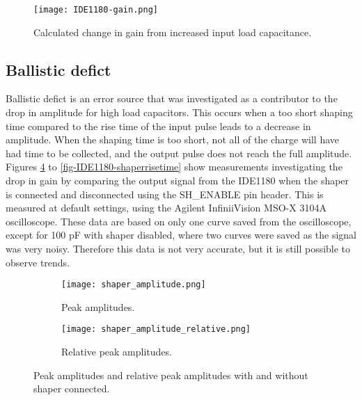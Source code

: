 \documentclass[../main/thesis.tex]{subfiles}
\begin{document}
\begin{figure}%
	\centering
	\texttt{[image: IDE1180-gain.png]}
	\caption{Calculated change in gain from increased input load capacitance. \citep{IDE1180email}}
	\label{fig-ide-gain}
\end{figure} 


\subsection{Ballistic defict}
\label{ide-gain-ballistic}

Ballistic defict is an error source that was investigated as a contributor to the drop in amplitude for high load capacitors. This occurs when a too short shaping time compared to the rise time of the input pulse leads to a decrease in amplitude. When the shaping time is too short, not all of the charge will have had time to be collected, and the output pulse does not reach the full amplitude. Figures \ref{fig-IDE1180-shaperamp} to \ref{fig-IDE1180-shaperrisetime} show measurements investigating the drop in gain by comparing the output signal from the IDE1180 when the shaper is connected and disconnected using the SH\_ENABLE pin header. This is measured at default settings, using the Agilent InfiniiVision MSO-X 3104A oscilloscope. These data are based on only one curve saved from the oscilloscope, except  for 100 pF with shaper disabled, where two curves were saved as the signal was very noisy. Therefore this data is not very accurate, but it is still possible to observe trends. 

\begin{figure}
	\centering
	\begin{subfigure}{.5\textwidth}
		\centering
		\texttt{[image: shaper\_amplitude.png]}
		\caption{Peak amplitudes.}
		\label{fig-IDE1180-shaperamp-}
	\end{subfigure}%
	\begin{subfigure}{.5\textwidth}
		\centering
		\texttt{[image: shaper\_amplitude\_relative.png]}
		\caption{Relative peak amplitudes.}
		\label{fig-IDE1180-shaperamp-rel} %
	\end{subfigure}
	\caption{Peak amplitudes and relative peak amplitudes with and without shaper connected.}
	\label{fig-IDE1180-shaperamp}
\end{figure}
\end{document}
